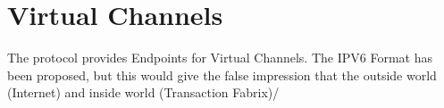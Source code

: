 \documentclass[../HFT-main.tex]{subfiles}
\begin{document}

%

\newpage
\section{Virtual Channels}

The protocol provides Endpoints for Virtual Channels. The IPV6 Format has been proposed, but this would give the false impression that the outside world (Internet) and inside world (Transaction Fabrix)/ %


\end{document}

